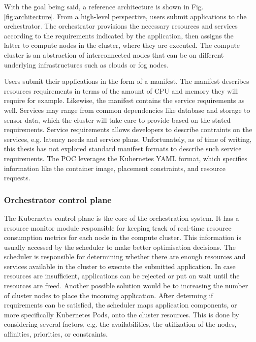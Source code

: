 With the goal being said, a reference architecture is shown in Fig. \ref{fig:architecture}. From a high-level perspective, users submit applications to the orchestrator. The orchestrator provisions the necessary resources and services according to the requirements indicated by the application, then assigns the latter to compute nodes in the cluster, where they are executed. The compute cluster is an abstraction of interconnected nodes that can be on different underlying infrastructures such as clouds or fog nodes.

Users submit their applications in the form of a manifest. The manifest describes resources requirements in terms of the amount of CPU and memory they will require for example. Likewise, the manifest contains the service requirements as well. Services may range from common dependencies like database and storage to sensor data, which the cluster will take care to provide based on the stated requirements. Service requirements allows developers to describe contraints on the services, e.g. latency needs and service plans. Unfortunately, as of time of writing, this thesis has not explored standard manifest formats to describe such service requirements. The POC leverages the Kubernetes YAML format, which specifies information like the container image, placement constraints, and resource requests.

\subsubsection{Orchestrator control plane}

The Kubernetes control plane is the core of the orchestration system. It has a resource monitor module responsible for keeping track of real-time resource consumption metrics for each node in the compute cluster. This information is usually accessed by the scheduler to make better optimisation decisions. The scheduler is responsible for determining whether there are enough resources and services available in the cluster to execute the submitted application. In case resources are insufficient, applications can be rejected or put on wait until the resources are freed. Another possible solution would be to increasing the number of cluster nodes to place the incoming application. After determing if requirements can be satisfied, the scheduler maps application components, or more specifically Kubernetes Pods, onto the cluster resources. This is done by considering several factors, e.g. the availabilities, the utilization of the nodes, affinities, priorities, or constraints.

